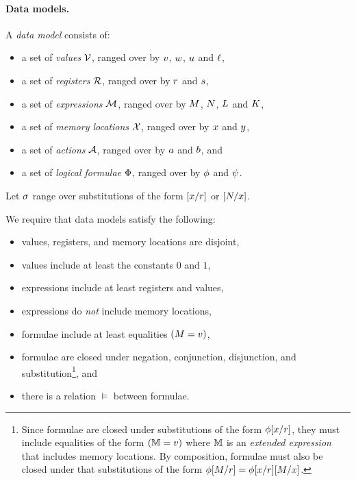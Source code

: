 \paragraph{Data models.}
A \emph{data model} consists of:
\begin{itemize}
\item a set of \emph{values} $\mathcal{V}$, ranged over by
  $v$, $w$, $u$ and $\ell$,
\item a set of \emph{registers} $\mathcal{R}$, ranged over by
  $r$ and $s$,
\item a set of \emph{expressions} $\mathcal{M}$, ranged over by
  $M$, $N$, $L$ and $K$,
\item a set of \emph{memory locations} $\mathcal{X}$, ranged over by $x$ and
  $y$, 
\item a set of \emph{actions} $\mathcal{A}$, ranged over by $a$ and $b$, and
\item a set of \emph{logical formulae} $\Phi$, ranged over by
  $\phi$ and $\psi$.
\end{itemize}

Let $\sigma$ range over substitutions of the form
$[x/r]$ or $[N/x]$.

We require that data models satisfy the following:
\begin{itemize}
\item values, registers, and memory locations are disjoint,
\item values include at least the constants $0$ and $1$,
\item expressions include at least registers and values,
\item expressions do \emph{not} include memory locations, %
\item formulae include at least %
  equalities %
  $(M=v)$, %
\item formulae are closed under negation, conjunction, disjunction, and
  substitution\footnote{Since formulae are closed under substitutions of the
    form $\phi[x/r]$, they must include equalities of the form
    $(\mathbb{M}=v)$ where $\mathbb{M}$ is an \emph{extended expression} that
    includes memory locations.  By composition, formulae must also be closed
    under that substitutions of the form
    $\phi[M/r]=\phi[x/r][M/x]$.}, and
\item there is a relation $\vDash$ between formulae.
\end{itemize}

